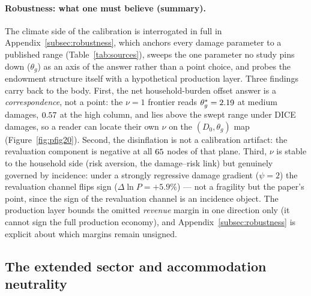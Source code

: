 \documentclass[12pt]{article}
\begin{document}
\paragraph{Robustness: what one must believe (summary).}
The climate side of the calibration is interrogated in full in
Appendix~\ref{subsec:robustness}, which anchors every damage parameter to a
published range (Table~\ref{tab:sources}), sweeps the one parameter no
study pins down ($\theta_g$) as an axis of the answer rather than a point
choice, and probes the endowment structure itself with a hypothetical
production layer. Three findings carry back to the body. First, the
net household-burden offset answer is a \emph{correspondence}, not a point: the $\nu=1$
frontier reads $\theta_g^{*}=2.19$ at medium damages,
$0.57$ at the high column, and lies above the swept range under
DICE damages, so a reader can locate their own $\nu$ on the
$(D_0,\theta_g)$ map (Figure~\ref{fig:pfig20}). Second, the disinflation is
not a calibration artifact: the revaluation component is negative at all
$65$ nodes of that plane. Third, $\nu$ is stable to the household
side (risk aversion, the damage--risk link) but genuinely governed by
incidence: under a strongly regressive damage gradient ($\psi=2$) the
revaluation channel flips sign ($\Delta\ln P=+5.9\%$) --- not a fragility
but the paper's point, since the sign of the revaluation channel is an
incidence object. The production layer bounds the omitted \emph{revenue}
margin in one direction only (it cannot sign the full production economy),
and Appendix~\ref{subsec:robustness} is explicit about which margins remain
unsigned.


\subsection{The extended sector and accommodation neutrality}\label{subsec:extended}
\end{document}

